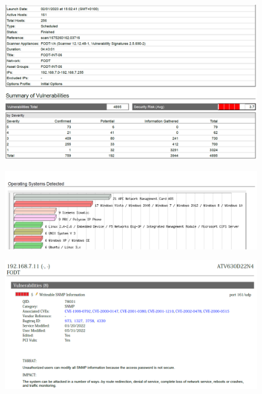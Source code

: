 \documentclass[target=bach,aauheader=]{thud}
\begin{document}
\begin{figure}[h]
    \centering
    \includegraphics[width=1\linewidth]{images/FODT-INT-06_1.png}
    \caption{}
    \label{fig:fodt-int-06_1}
\end{figure}

\begin{figure}[h]
    \centering
    \includegraphics[width=1\linewidth]{images/FODT-INT-06_2.png}
    \caption{}
    \label{fig:fodt-int-06_2}
\end{figure}

\pagebreak

\begin{figure}[h]
    \centering
    \includegraphics[width=1\linewidth]{images/FODT-INT-06_3.png}
    \caption{}
    \label{fig:fodt-int-06_3}
\end{figure}
\end{document}
